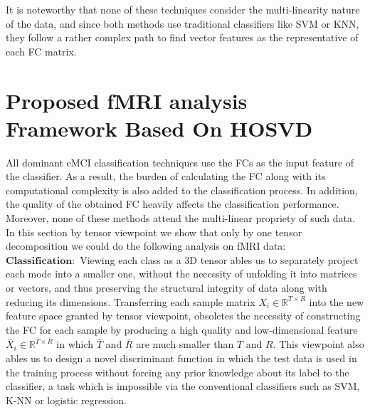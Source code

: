 \documentclass[preprint,12pt]{elsarticle}
\begin{document}
	It is noteworthy that none of these techniques consider the multi-linearity nature of the data, and since both methods use traditional classifiers like SVM or KNN, they follow a rather complex path to find vector features as the representative of each FC matrix.
	
	
	
	
	\section{Proposed fMRI analysis Framework Based On HOSVD}
	
	All dominant eMCI classification techniques use the FCs as the input feature of the classifier. As a result, the burden of calculating the FC along with its computational complexity is also added to the classification process. 
	In addition, the quality of the obtained FC heavily affects the classification performance. Moreover, none of these methods attend the multi-linear propriety of such data.
	In this section by tensor viewpoint we show that only by one tensor decomposition we could do the following analysis on fMRI data:
	\textbullet\ $\mathbf{Classification:}$ Viewing each class as a 3D tensor ables us to separately project each mode into a smaller one, without the necessity of unfolding it into matrices or vectors, and thus preserving the structural integrity of data along with reducing its dimensions. Transferring each sample matrix $X_i\in \mathbb{R}^{T \times R}$ into the new feature space granted by tensor viewpoint, obsoletes the necessity of constructing the FC for each sample by producing a high quality and low-dimensional feature $\bar{X}_i \in \mathbb{R}^{\bar{T} \times \bar{R}}$ in which $\bar{T}$ and $\bar{R}$ are much smaller than $T$ and $R$. This viewpoint also ables us to design a novel discriminant function in which the test data is used in the training process without forcing any prior knowledge about its label to the classifier, a task which is impossible via the conventional classifiers such as SVM, K-NN or logistic regression. \\
\end{document}
